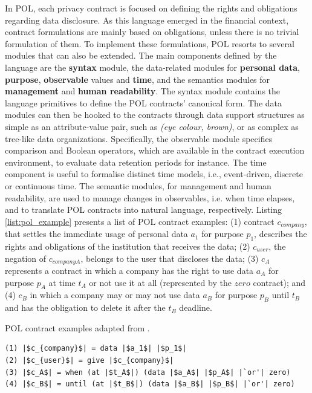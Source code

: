 In POL, each privacy contract is focused on defining the rights and obligations regarding data disclosure.
As this language emerged in the financial context, contract formulations are mainly based on obligations, unless there is no trivial formulation of them.
To implement these formulations, POL resorts to several modules that can also be extended.
The main components defined by the language are the \textbf{syntax} module, the data-related modules for \textbf{personal data}, \textbf{purpose}, \textbf{observable} values and \textbf{time}, and the semantics modules  for \textbf{management} and \textbf{human readability}.
The syntax module contains the language primitives to define the POL contracts' canonical form. 
The data modules can then be hooked to the contracts through data support structures as simple as an attribute-value pair, such as \textit{(eye colour, brown)}, or as complex as tree-like data organizations.
Specifically, the observable module specifies comparison and Boolean operators, which are available in the contract execution environment, to evaluate data retention periods for instance.
The time component is useful to formalise distinct time models, i.e., event-driven, discrete or continuous time.
The semantic modules, for management and human readability, are used to manage changes in observables, i.e. when time elapses, and to translate POL contracts into natural language, respectively. 
Listing \ref{list:pol_example} presents a list of POL contract examples: (1) contract $c_{company}$, that settles the immediate usage of personal data $a_1$ for purpose $p_1$, describes the rights and obligations of the institution that receives the data; (2) $c_{user}$, the negation of $c_{companyA}$, belongs to the user that discloses the data; (3) $c_A$ represents a contract in which a company has the right to use data $a_A$ for purpose $p_A$ at time $t_A$ or not use it at all (represented by the $zero$ contract); and (4) $c_B$ in which a company may or may not use data $a_B$ for purpose $p_B$ until $t_B$ and has the obligation to delete it after the $t_B$ deadline.

\begin{listing}
\caption{POL contract examples adapted from \cite{berthold_towards_2011}.}
\label{list:pol_example}
\begin{verbatim}
(1) |$c_{company}$| = data |$a_1$| |$p_1$|
(2) |$c_{user}$| = give |$c_{company}$|
(3) |$c_A$| = when (at |$t_A$|) (data |$a_A$| |$p_A$| |`or'| zero)
(4) |$c_B$| = until (at |$t_B$|) (data |$a_B$| |$p_B$| |`or'| zero) 
\end{verbatim}
\end{listing}

